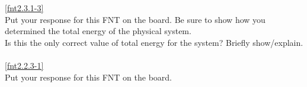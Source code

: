 \noindent\ref{fnt2.3.1-3}\\

\noindent Put your response for this FNT on the board. Be sure to show how you determined the total energy of the physical system.\\

\noindent Is this the only correct value of total energy for the system? Briefly show/explain.\\

\noindent{}\\

\noindent\ref{fnt2.2.3-1}\\

\noindent Put your response for this FNT on the board.\\

\WCD